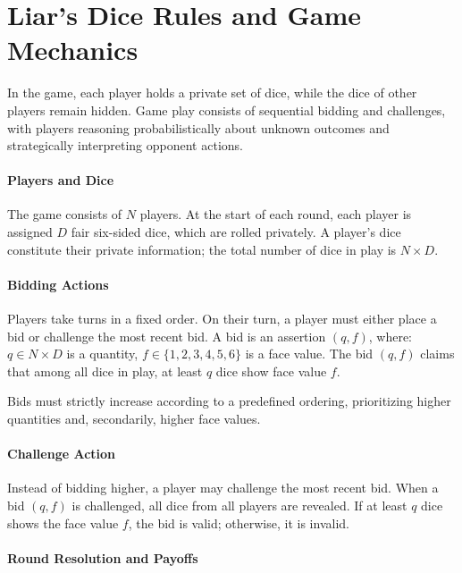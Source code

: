 
\section{Liar’s Dice Rules and Game Mechanics}
\label{app:rules}

In the game, each player holds a private set of dice, while the dice of other players remain hidden. Game play consists of sequential bidding and challenges, with players reasoning probabilistically about unknown outcomes and strategically interpreting opponent actions.

\paragraph{Players and Dice}

The game consists of $N$ players. At the start of each round, each player is assigned $D$ fair six-sided dice, which are rolled privately. A player’s dice constitute their private information; the total number of dice in play is $N \times D$.

\paragraph{Bidding Actions}

Players take turns in a fixed order. On their turn, a player must either place a bid or challenge the most recent bid. A bid is an assertion $(q, f)$, where: $q \in N \times D$ is a quantity, $f \in \{1,2,3,4,5,6\}$ is a face value. The bid $(q, f)$ claims that among all dice in play, at least $q$ dice show face value $f$.

Bids must strictly increase according to a predefined ordering, prioritizing higher quantities and, secondarily, higher face values.

\paragraph{Challenge Action}

Instead of bidding higher, a player may challenge the most recent bid. When a bid $(q, f)$ is challenged, all dice from all players are revealed. If at least $q$ dice shows the face value $f$, the bid is valid; otherwise, it is invalid.

\paragraph{Round Resolution and Payoffs}

